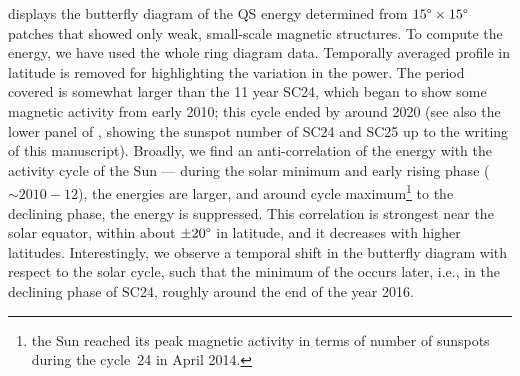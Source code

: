 \documentclass{aa}
\begin{document}




 displays the butterfly diagram of the QS
\fff energy determined
from $15\degree \times 15\degree$ patches that showed only weak, small-scale magnetic structures.
To compute the \fff
energy, we have used the whole ring diagram data.
Temporally averaged profile in latitude is removed for highlighting the variation in the
\fff power. The period covered is somewhat larger than the 11 year %
SC24,
which
began to show some magnetic activity from early 2010; this cycle ended by around 2020 (see also the lower panel of , showing the sunspot number of SC24 and SC25 up to the writing of this manuscript).
Broadly, we find an anti-correlation of the \fff 
energy with the activity cycle of the
Sun --- during the solar minimum and early rising phase ($\sim 2010-12$), the \fff
energies
are larger, and around cycle maximum\footnote{the Sun reached its peak magnetic activity
in terms of number of sunspots during the cycle~24 in April 2014.} to the declining phase,
the \fff
energy 
is suppressed.
This correlation is strongest near the solar equator, within about $\pm 20\degree$ in
latitude, and it decreases with higher latitudes.
Interestingly, we observe a temporal shift in the \fff butterfly diagram with respect to the
solar cycle, such that the minimum of the \fff occurs later, i.e., in the declining phase of
SC24, roughly around the end of the year 2016.
\end{document}
